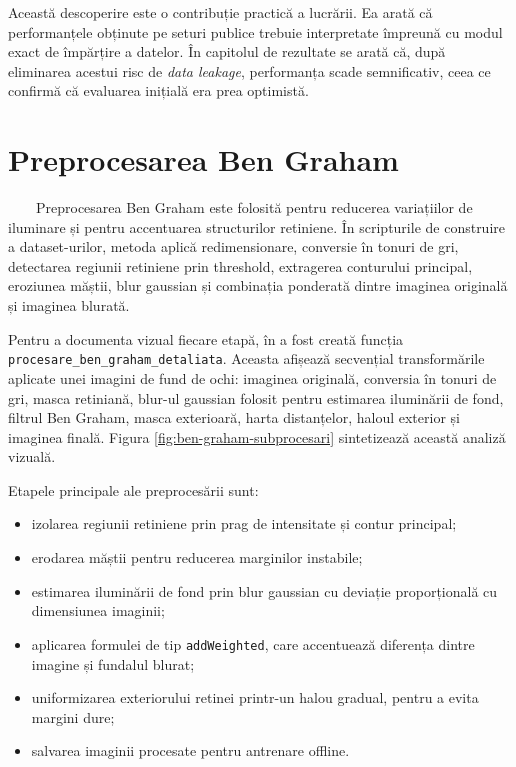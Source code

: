 \documentclass[12pt, a4paper, twoside, romanian]{teza-upb}
\begin{document}
Această descoperire este o contribuție practică a lucrării. Ea arată că performanțele obținute
pe seturi publice trebuie interpretate împreună cu modul exact de împărțire a datelor. În
capitolul de rezultate se arată că, după eliminarea acestui risc de \textit{data leakage},
performanța scade semnificativ, ceea ce confirmă că evaluarea inițială era prea optimistă.

\section{Preprocesarea Ben Graham}

\ \ \ \ Preprocesarea Ben Graham este folosită pentru reducerea variațiilor de iluminare și pentru
accentuarea structurilor retiniene. În scripturile de construire a dataset-urilor, metoda aplică
redimensionare, conversie în tonuri de gri, detectarea regiunii retiniene prin threshold,
extragerea conturului principal, eroziunea măștii, blur gaussian și combinația ponderată dintre
imaginea originală și imaginea blurată.
\bigskip

Pentru a documenta vizual fiecare etapă, în  a fost creată
funcția \texttt{procesare\_ben\_graham\_detaliata}. Aceasta afișează secvențial transformările
aplicate unei imagini de fund de ochi: imaginea originală, conversia în tonuri de gri, masca
retiniană, blur-ul gaussian folosit pentru estimarea iluminării de fond, filtrul Ben Graham,
masca exterioară, harta distanțelor, haloul exterior și imaginea finală. Figura
\ref{fig:ben-graham-subprocesari} sintetizează această analiză vizuală.
\bigskip

Etapele principale ale preprocesării sunt:

\begin{itemize}
  \item izolarea regiunii retiniene prin prag de intensitate și contur principal;
  \item erodarea măștii pentru reducerea marginilor instabile;
  \item estimarea iluminării de fond prin blur gaussian cu deviație proporțională cu dimensiunea imaginii;
  \item aplicarea formulei de tip \texttt{addWeighted}, care accentuează diferența dintre imagine și fundalul blurat;
  \item uniformizarea exteriorului retinei printr-un halou gradual, pentru a evita margini dure;
  \item salvarea imaginii procesate pentru antrenare offline.
\end{itemize}
\bigskip
\end{document}
